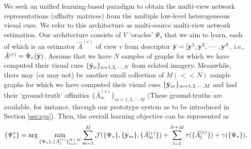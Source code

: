 We seek an unified learning-based paradigm to obtain the multi-view network representations (affinity matrices) from the multiple low-level heterogeneous visual cues. We refer to this architecture as multi-source multi-view network estimation. Our architecture consists of $V$ `oracles' $\Psi_{v}$ that we aim to learn, each of which is an estimator $\hat{A}^{(v)}$ of view $v$ from descriptor $\bar{{\bf y}}=[{\bf y}^1,{\bf y}^2, \cdots,{\bf y}^S$, i.e., $\hat{A}^{(v)}=\Psi_{v}(\bar{{\bf y}})$. Assume that we have $N$ samples of graphs for which we have computed their visual cues $\{\bar{{\bf y}}_{n}\}_{n=1,2,\cdots,N}$  from related imagery. Meanwhile, there may (or may not) be another small collection of $M(<<N)$ sample graphs for which we have computed their visual cues $\{\bar{{\bf y}}_{m}\}_{m=1,2,\cdots,M}$ and had their `ground-truth' affinities $\{\bar{A}^{(v)}_{m}\}_{m=1,2,\cdots,M}$ (These ground-truths are available, for instance, through our prototype system as to be introduced in Section \ref{sec:sys}). Then, the overall learning objective can be represented as 
\begin{equation}\label{eq:sensing}
\{\Psi^{*}_{v}\}=\arg\min_{\{\Psi_{v}\},\{\hat{A}^{(v)}_l\}_{l=1}^{N+M}}\sum_{m=1}^{M}\mathcal{J}(\{\Psi_{v}\}, \{\bar{{\bf y}}_m\}, \{\bar{A}^{(v)}_m\})+\sum_{l=1}^{N+M}\tau(\{\hat{A}^{(v)}_l\})+\gamma(\{\Psi_{v}\}).
 \end{equation}
 
